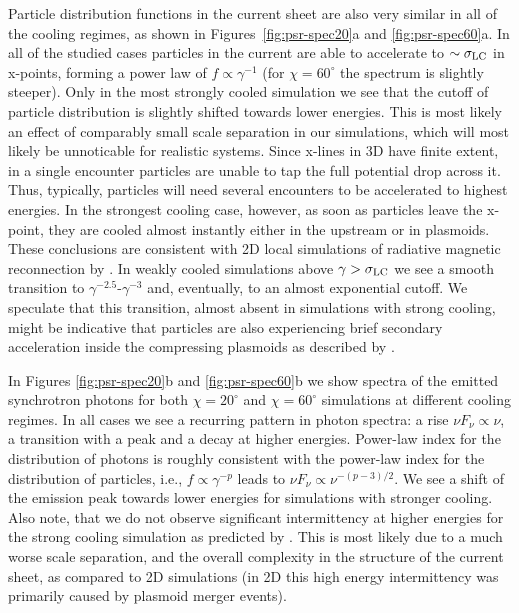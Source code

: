 Particle distribution functions in the current sheet are also very similar in all of the cooling regimes, as shown in Figures~\ref{fig:psr-spec20}a and \ref{fig:psr-spec60}a. In all of the studied cases particles in the current are able to accelerate to $\sim\sigma_{\rm LC}$ in x-points, forming a power law of $f\propto \gamma^{-1}$ (for $\chi=60^\circ$ the spectrum is slightly steeper). Only in the most strongly cooled simulation we see that the cutoff of particle distribution is slightly shifted towards lower energies. This is most likely an effect of comparably small scale separation in our simulations, which will most likely be unnoticable for realistic systems. Since x-lines in 3D have finite extent, in a single encounter particles are unable to tap the full potential drop across it. Thus, typically, particles will need several encounters to be accelerated to highest energies. In the strongest cooling case, however, as soon as particles leave the x-point, they are cooled almost instantly either in the upstream or in plasmoids. These conclusions are consistent with 2D local simulations of radiative magnetic reconnection by \cite{2019ApJ...877...53H}. In weakly cooled simulations above $\gamma>\sigma_{\rm LC}$ we see a smooth transition to $\gamma^{-2.5}\text{-}\gamma^{-3}$ and, eventually, to an almost exponential cutoff. We speculate that this transition, almost absent in simulations with strong cooling, might be indicative that particles are also experiencing brief secondary acceleration inside the compressing plasmoids as described by \cite{2018MNRAS.481.5687P,2021ApJ...912...48H}.

In Figures \ref{fig:psr-spec20}b and \ref{fig:psr-spec60}b we show spectra of the emitted synchrotron photons for both $\chi=20^\circ$ and $\chi=60^\circ$ simulations at different cooling regimes. In all cases we see a recurring pattern in photon spectra: a rise $\nu F_\nu\propto \nu$, a transition with a peak and a decay at higher energies. Power-law index for the distribution of photons is roughly consistent with the power-law index for the distribution of particles, i.e., $f\propto \gamma^{-p}$ leads to $\nu F_\nu \propto \nu^{-(p-3)/2}$. We see a shift of the emission peak towards lower energies for simulations with stronger cooling. Also note, that we do not observe significant intermittency at higher energies for the strong cooling simulation as predicted by \cite{2019ApJ...877...53H}. This is most likely due to a much worse scale separation, and the overall complexity in the structure of the current sheet, as compared to 2D simulations (in 2D this high energy intermittency was primarily caused by plasmoid merger events).

